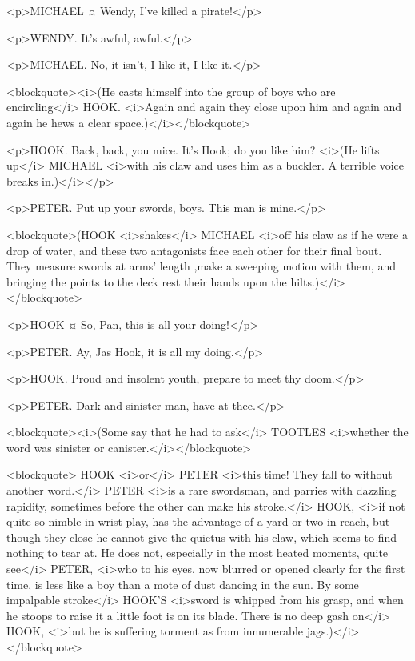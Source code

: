 <p>MICHAEL ¤
Wendy, I've killed a pirate!</p>

<p>WENDY. It's awful, awful.</p>

<p>MICHAEL. No, it isn't, I like it, I like it.</p>

<blockquote><i>(He casts himself into the group of boys who are encircling</i> HOOK. <i>Again and again they close upon him and again and again he hews a clear space.)</i></blockquote>

<p>HOOK. Back, back, you mice. It's Hook; do you like him? <i>(He lifts up</i> MICHAEL <i>with his claw and uses him as a buckler. A terrible voice breaks in.)</i></p>

<p>PETER. Put up your swords, boys. This man is mine.</p>

<blockquote>(HOOK <i>shakes</i> MICHAEL <i>off his claw as if he were a drop of water, and these two antagonists face each other for their final bout. They measure swords at arms' length ,make a sweeping motion with them, and bringing the points to the deck rest their hands upon the hilts.)</i></blockquote>

<p>HOOK ¤
So, Pan, this is all your doing!</p>

<p>PETER. Ay, Jas Hook, it is all my doing.</p>

<p>HOOK. Proud and insolent youth, prepare to meet thy doom.</p>

<p>PETER. Dark and sinister man, have at thee.</p>

<blockquote><i>(Some say that he had to ask</i> TOOTLES <i>whether the word was sinister or canister.</i></blockquote>

<blockquote> HOOK <i>or</i> PETER <i>this time! They fall to without another word.</i> PETER <i>is a rare swordsman, and parries with dazzling rapidity, sometimes before the other can make his stroke.</i> HOOK, <i>if not quite so nimble in wrist play, has the advantage of a yard or two in reach, but though they close he cannot give the quietus with his claw, which seems to find nothing to tear at. He does not, especially in the most heated moments, quite see</i> PETER, <i>who to his eyes, now blurred or opened clearly for the first time, is less like a boy than a mote of dust dancing in the sun. By some impalpable stroke</i> HOOK'S <i>sword is whipped from his grasp, and when he stoops to raise it a little foot is on its blade. There is no deep gash on</i> HOOK, <i>but he is suffering torment as from innumerable jags.)</i></blockquote>

